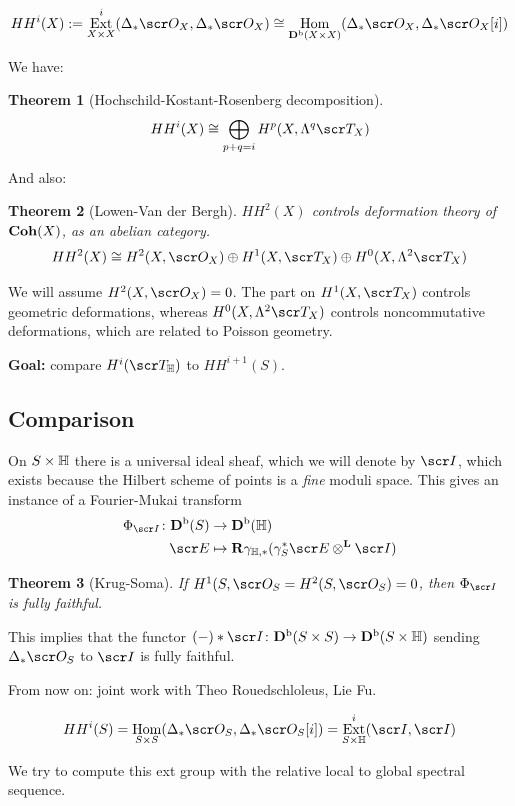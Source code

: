 \documentclass[A4paper, british]{amsart}
\theoremstyle{darkgreentheorem}
\newtheorem{thm}{Theorem}[section]
\theoremstyle{darkbluedefinition}
\theoremstyle{darkredexample}
\theoremstyle{remark}
\DeclareMathOperator{\Hom}{Hom}
\DeclareMathOperator{\Ext}{Ext}
\newcommand{\HH}{HH}
\newcommand{\1}{\mathbbm{1}}
\newcommand{\ot}{\otimes}
\newcommand{\op}{\oplus}
\newcommand{\tms}{\times}
\begin{document}
\[ \HH^{i}(X):=\Ext^{i}_{X\times X}(\Delta_{*}\O_{X},\Delta_{*}\O_{X})\cong \Hom_{\Db(X\times X)}(\Delta_{*}\O_{X},\Delta_{*}\O_{X}[i]) \]

We have:
\begin{thm}[Hochschild-Kostant-Rosenberg decomposition]
    \[ \HH^{i}(X)\cong \bigoplus_{p+q=i}H^{p}(X,\Lambda^{q}\sT_{X}) \]
\end{thm}

And also:
\begin{thm}[Lowen-Van der Bergh]
    $\HH^{2}(X)$ controls deformation theory of $\mathbf{Coh}(X)$, as an abelian category.
    \[ \HH^{2}(X)\cong H^{2}(X,\O_{X})\op H^{1}(X,\sT_{X})\op H^{0}(X,\Lambda^{2}\sT_{X}) \]
\end{thm}

We will assume $H^{2}(X,\O_{X})=0$.
The part on $H^{1}(X,\sT_{X})$ controls geometric deformations, whereas $H^{0}(X,\Lambda^{2}\sT_{X})$ controls noncommutative deformations, which are related to Poisson geometry.

\textbf{Goal:} compare $H^{i}(\sT_{\bbH})$ to $\HH^{i+1}(S)$.

\subsection{Comparison}

On $S\times \mathbb{H}$ there is a universal ideal sheaf, which we will denote by $\I$, which exists because the Hilbert scheme of points is a \textit{fine} moduli space.
This gives an instance of a Fourier-Mukai transform
\begin{align*}
    \Phi_{\I}\colon \Db(S) & \to \Db(\bbH) \\
    \E & \mapsto \bfR \gamma_{\bbH,*}(\gamma_{S}^{*}\E\ot^{\bfL}\I) 
\end{align*}

\begin{thm}[Krug-Soma]
    If $H^{1}(S,\O_{S}=H^{2}(S,\O_{S})=0$, then $\Phi_{\I}$ is fully faithful.
\end{thm}

This implies that the functor $(-)*\I\colon \Db(S\tms S)\to \Db(S\tms \bbH)$ sending $\Delta_{*}\O_{S}$ to $\I$ is fully faithful.

From now on: joint work with Theo Rouedschloleus, Lie Fu.

\[ \HH^{i}(S)=\Hom_{S\times S}(\Delta_{*}\O_{S},\Delta_{*}\O_{S}[i])=\Ext^{i}_{S\times \bbH}(\I,\I) \]

We try to compute this ext group with the relative local to global spectral sequence.
\end{document}
